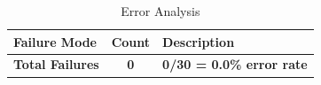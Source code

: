 \begin{table}[h]
\centering
\caption{Error Analysis}
\label{tab:error-analysis}
\begin{tabular}{lcp{8cm}}
\toprule
\textbf{Failure Mode} & \textbf{Count} & \textbf{Description} \\
\midrule
\midrule
\textbf{Total Failures} & \textbf{0} & \textbf{0/30 = 0.0\% error rate} \\
\bottomrule
\end{tabular}
\end{table}

